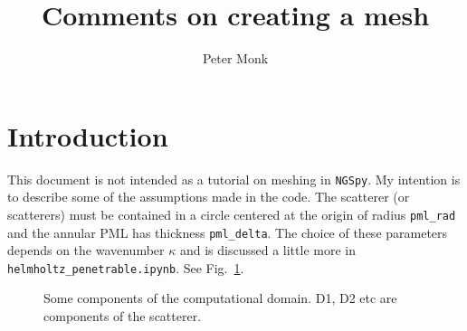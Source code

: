 \documentclass[12pt]{article}
\title{Comments on creating a mesh}
\author{Peter Monk}
\begin{document}
\maketitle

\section{Introduction}
This document is not intended as a tutorial on meshing in {\tt NGSpy}.  My intention is to describe some of the assumptions made in the code.  The scatterer (or scatterers) must be contained in a circle centered at the origin 
of radius \verb+pml_rad+ and the annular PML has thickness \verb+pml_delta+.  The choice of these parameters depends on the wavenumber $\kappa$ and is discussed a little more in \verb+helmholtz_penetrable.ipynb+.  See Fig.~\ref{fig1}.
\begin{figure}[h]
\begin{center}
\end{center}
\caption{Some components of the computational domain. D1, D2 etc are components of the scatterer.}\label{fig1}
\end{figure}
\end{document}
